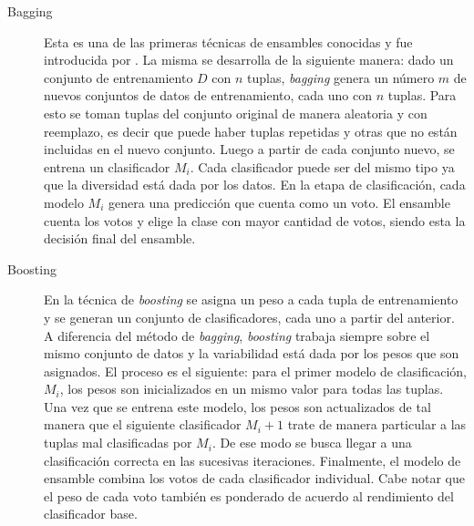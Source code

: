 \begin{description}

	\item[Bagging] Esta es una de las primeras técnicas de ensambles conocidas y
	      fue introducida por
	      \citeauthor{breiman_bagging_1996}\cite{breiman_bagging_1996}. La misma se
	      desarrolla de la siguiente manera: dado un conjunto de entrenamiento $D$
	      con $n$  tuplas, \textit{bagging} genera un número $m$ de nuevos conjuntos
	      de datos de entrenamiento, cada uno con $n$ tuplas. Para esto se toman
	      tuplas del conjunto original de manera aleatoria y con reemplazo, es decir
	      que puede haber tuplas repetidas y otras que no están incluidas en el
	      nuevo conjunto.  Luego a partir de cada conjunto nuevo, se entrena un
	      clasificador $M_{i}$. Cada clasificador puede ser del mismo tipo ya que la
	      diversidad está dada por los datos. En la etapa de clasificación, cada
	      modelo $M_{i}$ genera una predicción que cuenta como un voto. El ensamble
	      cuenta los votos y elige la clase con mayor cantidad de votos, siendo esta
	      la decisión final del ensamble.


	\item[Boosting] En la técnica de \textit{boosting} se asigna un peso a cada
	      tupla de entrenamiento y se generan un conjunto de clasificadores, cada
	      uno a partir del anterior. A diferencia del método de \textit{bagging},
	      \textit{boosting} trabaja siempre sobre el mismo conjunto de datos y la
	      variabilidad está dada por los pesos que son asignados. El proceso es el
	      siguiente: para el primer modelo de clasificación, $M_{i}$, los pesos son
	      inicializados en un mismo valor para todas las tuplas. Una vez que se
	      entrena este modelo, los pesos son actualizados de tal manera que el
	      siguiente clasificador $M_{i} + 1$ trate de manera particular a las tuplas
	      mal clasificadas por $M_{i}$. De ese modo se busca llegar a una
	      clasificación correcta en las sucesivas iteraciones.  Finalmente, el
	      modelo de ensamble combina los votos de cada clasificador individual. Cabe
	      notar que el peso de cada voto también es ponderado de acuerdo al
	      rendimiento del clasificador base.



\end{description}
